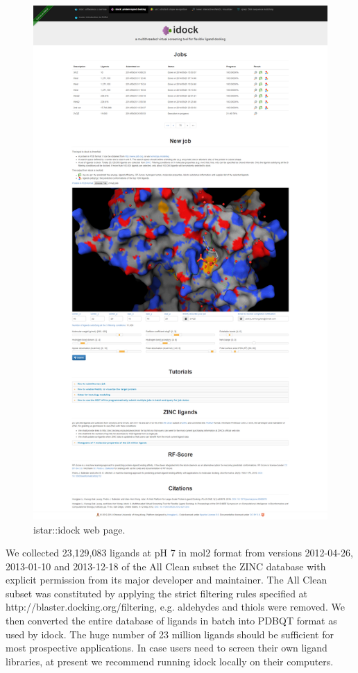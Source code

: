 \begin{figure}
\centering
\includegraphics[width=\linewidth]{../istar/idock.png}
\caption{istar::idock web page.}
\label{istar:idock}
\end{figure}

We collected 23,129,083 ligands at pH 7 in mol2 format from versions 2012-04-26, 2013-01-10 and 2013-12-18 of the All Clean subset the ZINC database \citep{532,1178} with explicit permission from its major developer and maintainer. The All Clean subset was constituted by applying the strict filtering rules specified at http://blaster.docking.org/filtering, e.g. aldehydes and thiols were removed. We then converted the entire database of ligands in batch into PDBQT format as used by idock. The huge number of 23 million ligands should be sufficient for most prospective applications. In case users need to screen their own ligand libraries, at present we recommend running idock locally on their computers.

